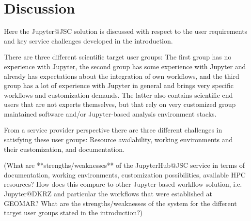 \section{Discussion}

Here the Jupyter@JSC solution is discussed with respect to the user requirements and key service challenges developed in the introduction.

There are three different scientific target user groups: The first group has no experience with Jupyter, the second group has some experience with Jupyter and already has expectations about the integration of own workflows, and the third group has a lot of experience with Jupyter in general and brings very specific workflows and customization demands.
The latter also contains scientific end-users that are not experts themselves, but that rely on very customized group maintained software and/or Jupyter-based analysis environment stacks.

From a service provider perspective there are three different challenges in satisfying these user groups: Resource availability, working environments and their customization, and documentation.

(What are **strengths/weaknesses** of the JupyterHub@JSC service in terms of documentation, working environments, customization possibilities, available HPC resources? How does this compare to other Jupyter-based workflow solution, i.e. Jupyter@DKRZ and particular the workflows that were established at GEOMAR? What are the strengths/weaknesses of the system for the different target user groups stated in the introduction?)

%

